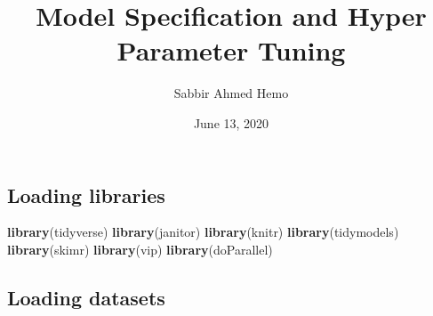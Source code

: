 \documentclass[]{article}
\title{Model Specification and Hyper Parameter Tuning}
\author{Sabbir Ahmed Hemo}
\date{June 13, 2020}
\newenvironment{Shaded}{\begin{snugshade}}{\end{snugshade}}
\newcommand{\DataTypeTok}[1]{\textcolor[rgb]{0.13,0.29,0.53}{#1}}
\newcommand{\KeywordTok}[1]{\textcolor[rgb]{0.13,0.29,0.53}{\textbf{#1}}}
\newcommand{\NormalTok}[1]{#1}
\newcommand{\OperatorTok}[1]{\textcolor[rgb]{0.81,0.36,0.00}{\textbf{#1}}}
\newcommand{\StringTok}[1]{\textcolor[rgb]{0.31,0.60,0.02}{#1}}
\begin{document}
\maketitle

\hypertarget{loading-libraries}{%
\subsection{Loading libraries}\label{loading-libraries}}

\begin{Shaded}
\begin{Highlighting}[]
\KeywordTok{library}\NormalTok{(tidyverse)}
\KeywordTok{library}\NormalTok{(janitor)}
\KeywordTok{library}\NormalTok{(knitr)}
\KeywordTok{library}\NormalTok{(tidymodels)}
\KeywordTok{library}\NormalTok{(skimr)}
\KeywordTok{library}\NormalTok{(vip)}
\KeywordTok{library}\NormalTok{(doParallel)}
\end{Highlighting}
\end{Shaded}

\hypertarget{loading-datasets}{%
\subsection{Loading datasets}\label{loading-datasets}}

\begin{Shaded}
\end{Shaded}
\end{document}
